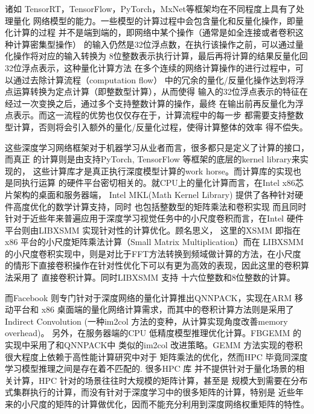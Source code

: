 诸如 TensorRT，TensorFlow，PyTorch，MxNet等框架均在不同程度上具有了处理量化
网络模型的能力。一些模型的计算过程中会包含量化和反量化操作，即量化计算的过程
并不是端到端的，即网络中某个操作（通常是如全连接或者卷积这种计算密集型操作）
的输入仍然是32位浮点数，在执行该操作之前，可以通过量化操作将对应的输入转换为
8位整数表示执行计算，最后再将计算的结果反量化回32位浮点表示，这种量化计算方法
在多个连续的网络计算操作的进行过程中，可以通过去除计算流程（computation flow）
中的冗余的量化/反量化操作达到将浮点运算转换为定点计算（即整数型计算），从而使得
输入的32位浮点表示的特征在经过一次变换之后，通过多个支持整数计算的操作，最终
在输出前再反量化为浮点表示。而这一流程的优势也仅仅存在于，计算流程中的每一步
都需要支持整数型计算，否则将会引入额外的量化/反量化过程，使得计算整体的效率
得不偿失。

这些深度学习网络框架对于机器学习从业者而言，很多都只是定义了计算的接口，而真正
的计算则是由支持PyTorch, TensorFlow 等框架的底层的kernel library来实现的，
这些计算库才是真正执行深度模型计算的work horse。而计算库的实现也是同执行运算
的硬件平台密切相关的。就CPU上的量化计算而言，在Intel x86芯片架构的桌面和服务器端，
Intel MKL(Math Kernel Library) 提供了各种针对硬件高度优化的数学计算支持，同时
也包括整数型的矩阵乘法和卷积实现
而且同时针对于近些年来普遍应用于深度学习视觉任务中的小尺度卷积而言，在Intel
硬件平台则由LIBXSMM\cite{Heinecke2016LIBXSMMAS} 实现针对性的计算优化。顾名思义，
这里的XSMM 即指在x86 平台的小尺度矩阵乘法计算（Small Matrix Multiplication）而在
LIBXSMM 的小尺度卷积实现中，则是对比于FFT方法转换到频域做计算的方法，在小尺度
的情形下直接卷积操作在针对性优化下可以有更为高效的表现，因此这里的卷积算法采用了
直接卷积计算。同时LIBXSMM 支持 十六位整数和8位整数的计算。

而Facebook 则专门针对于深度网络的量化计算推出QNNPACK，实现在ARM 移动平台和
x86 桌面端的量化网络计算需求，而其中的卷积计算方法则是采用了 Indirect Convolution
\cite{Dukhan2019TheIC}(一种im2col 方法的变种，从计算实现角度改善memory overhead)。
另外，在服务器端的CPU 低精度模型推理优化计算。FBGEMM 的实现中采用了和QNNPACK中
类似的im2col 改进策略。GEMM 方法实现的卷积很大程度上依赖于高性能计算研究中对于
矩阵乘法的优化，然而HPC 毕竟同深度学习模型推理之间是存在着不匹配的. 很多HPC 库
并不提供针对于量化场景的相关计算，HPC 针对的场景往往时大规模的矩阵计算，甚至是
规模大到需要在分布式集群执行的计算，而没有针对于深度学习中的很多矩阵的计算，特别是
近些年来的小尺度的矩阵的计算做优化，因而不能充分利用到深度网络权重矩阵的特性。

